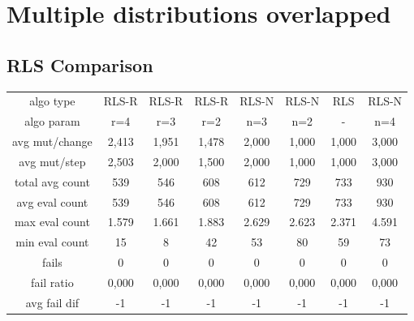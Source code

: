 \section{Multiple distributions overlapped}
\subsection{RLS Comparison}
\begin{tabular}[h]{cccccccc}
algo type&           RLS-R&    RLS-R&    RLS-R&    RLS-N&    RLS-N&      RLS&    RLS-N\\
algo param&            r=4&      r=3&      r=2&      n=3&      n=2&        -&      n=4\\
avg mut/change&      2,413&    1,951&    1,478&    2,000&    1,000&    1,000&    3,000\\
avg mut/step&        2,503&    2,000&    1,500&    2,000&    1,000&    1,000&    3,000\\
\hline
total avg count&       539&      546&      608&      612&      729&      733&      930\\
avg eval count&        539&      546&      608&      612&      729&      733&      930\\
max eval count&      1.579&    1.661&    1.883&    2.629&    2.623&    2.371&    4.591\\
min eval count&         15&        8&       42&       53&       80&       59&       73\\
\hline
fails&                   0&        0&        0&        0&        0&        0&        0\\
fail ratio&          0,000&    0,000&    0,000&    0,000&    0,000&    0,000&    0,000\\
avg fail dif&           -1&       -1&       -1&       -1&       -1&       -1&       -1\\
\end{tabular}
